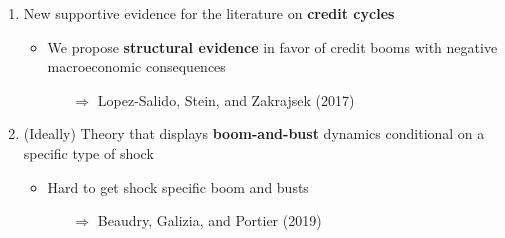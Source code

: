 \documentclass[hyperref={pdfpagelabels=false}]{beamer}
\begin{document}
{\begin{enumerate}
\begin{itemize}
		\end{itemize}
	
	\bigskip
	
	
	\item New supportive evidence for the literature on \textbf{credit cycles}
	\begin{itemize}
		\item \footnotesize{We propose \textbf{structural evidence} in favor of credit booms with negative macroeconomic consequences}
		\begin{itemize}
			\item[$\Rightarrow$] Lopez-Salido, Stein, and Zakrajsek (2017) 
		\end{itemize}
		\end{itemize}
	

	
	\bigskip
	
	\item (Ideally) Theory that displays \textbf{boom-and-bust} dynamics conditional on a specific type of shock
	\begin{itemize}
		\item Hard to get shock specific boom and busts
		\begin{itemize}
			\item[$\Rightarrow$] Beaudry, Galizia, and Portier (2019)
		\end{itemize} 
		\end{itemize}
	
	    
\end{enumerate}	
		
}

\end{document}
